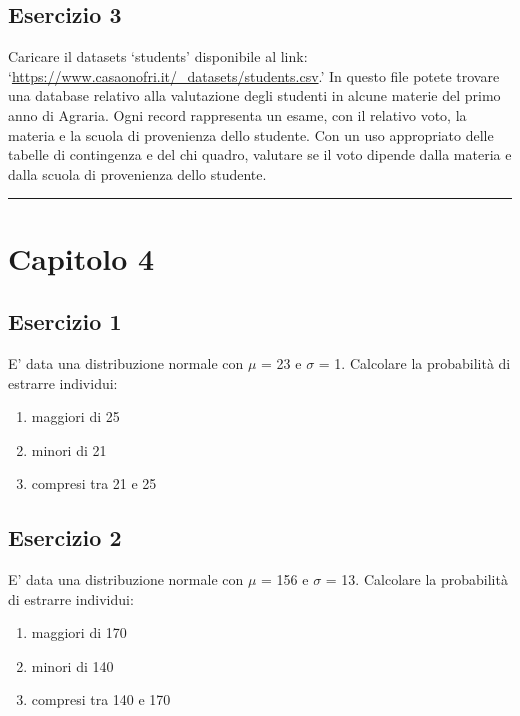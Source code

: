 \documentclass[a4paper,12pt,oneside]{book}
\providecommand{\tightlist}{%
  \setlength{\itemsep}{0pt}\setlength{\parskip}{0pt}}
\begin{document}
\hypertarget{esercizio-3}{%
\subsection{Esercizio 3}\label{esercizio-3}}

Caricare il datasets `students' disponibile al link: `\url{https://www.casaonofri.it/_datasets/students.csv}.' In questo file potete trovare una database relativo alla valutazione degli studenti in alcune materie del primo anno di Agraria. Ogni record rappresenta un esame, con il relativo voto, la materia e la scuola di provenienza dello studente. Con un uso appropriato delle tabelle di contingenza e del chi quadro, valutare se il voto dipende dalla materia e dalla scuola di provenienza dello studente.

\begin{center}\rule{0.5\linewidth}{0.5pt}\end{center}

\hypertarget{capitolo-4}{%
\section{Capitolo 4}\label{capitolo-4}}

\hypertarget{esercizio-1-2}{%
\subsection{Esercizio 1}\label{esercizio-1-2}}

E' data una distribuzione normale con \(\mu\) = 23 e \(\sigma\) = 1. Calcolare la probabilità di estrarre individui:

\begin{enumerate}
\def\labelenumi{\arabic{enumi}.}
\tightlist
\item
  maggiori di 25
\item
  minori di 21
\item
  compresi tra 21 e 25
\end{enumerate}

\hypertarget{esercizio-2-1}{%
\subsection{Esercizio 2}\label{esercizio-2-1}}

E' data una distribuzione normale con \(\mu\) = 156 e \(\sigma\) = 13. Calcolare la probabilità di estrarre individui:

\begin{enumerate}
\def\labelenumi{\arabic{enumi}.}
\tightlist
\item
  maggiori di 170
\item
  minori di 140
\item
  compresi tra 140 e 170
\end{enumerate}
\end{document}
